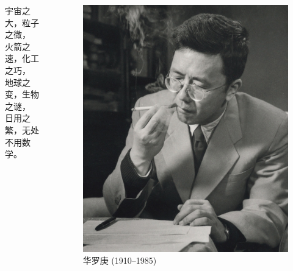 \documentclass[13pt,fontset=mac]{ctexbeamer}
\begin{document}
\begin{frame}

\begin{columns}[c]  %

	\column{6cm}
\begin{leftline}
	{\Large  宇宙之大，粒子之微，} \\[8pt]

	{ \Large 火箭之速，化工之巧，}\\[8pt]

	{ \Large 地球之变，生物之谜，}\\[8pt]

	{ \Large 日用之繁，无处不用数学。}
\end{leftline}


	\column{5cm}
	\begin{figure}[p]
		\includegraphics[scale=0.5]{hua.jpg}
		\caption{华罗庚 (1910--1985)}
	\end{figure}

\end{columns}

\end{frame}
\end{document}
